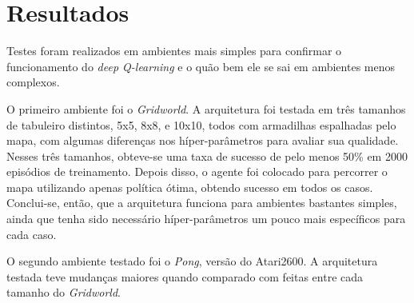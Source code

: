 
\chapter{Resultados}
\label{cap:resultados}

Testes foram realizados em ambientes mais simples para confirmar o funcionamento do \textit{deep Q-learning} e o quão bem ele se sai em ambientes menos complexos.


O primeiro ambiente foi o \textit{Gridworld}.
A arquitetura foi testada em três tamanhos de tabuleiro distintos, 5x5, 8x8, e 10x10, todos com armadilhas espalhadas pelo mapa, com algumas diferenças nos híper-parâmetros para avaliar sua qualidade.
Nesses três tamanhos, obteve-se uma taxa de sucesso de pelo menos 50\% em 2000 episódios de treinamento.
Depois disso, o agente foi colocado para percorrer o mapa utilizando apenas política ótima, obtendo sucesso em todos os casos.
Conclui-se, então, que a arquitetura funciona para ambientes bastantes simples, ainda que tenha sido necessário híper-parâmetros um pouco mais específicos para cada caso.

O segundo ambiente testado foi o \textit{Pong}, versão do Atari2600.
A arquitetura testada teve mudanças maiores quando comparado com feitas entre cada tamanho do \textit{Gridworld}.



